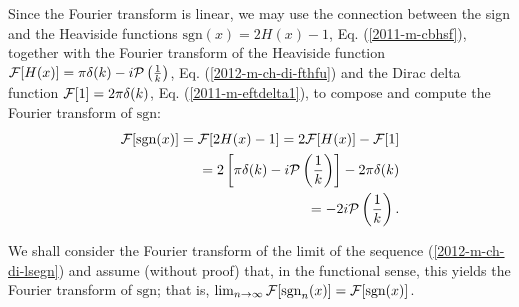 Since the Fourier transform is linear,
we may use the connection between the sign and the Heaviside functions $\textrm{sgn}(x) = 2H(x) -1$, Eq. (\ref{2011-m-cbhsf}),
together with the
Fourier transform of the Heaviside function
${\cal F}[H(x)] =  \pi \delta (k)   -i {\cal P} \left(\frac{1}{k}\right)$,
Eq. (\ref{2012-m-ch-di-fthfu}) and the Dirac delta function
${\cal F}[1] = 2\pi \delta (k)$, Eq. (\ref{2011-m-eftdelta1}),
to compose and compute the Fourier transform  of $\textrm{sgn}$:
\begin{equation}
\begin{split}
{\cal F}[\textrm{sgn}(x)] = {\cal F}[2H(x) -1] = 2{\cal F}[H(x)] - {\cal F}[1]
\\ \qquad =
2 \left[\pi \delta (k)   -i {\cal P} \left(\frac{1}{k}\right)\right] -  2\pi \delta (k)
\\ \qquad =
-2i {\cal P} \left(\frac{1}{k}\right)
.
\end{split}
\label{2011-m-ch-di-fdsgnfu}
\end{equation}

We shall consider the Fourier transform of the limit of the sequence (\ref{2012-m-ch-di-lsegn})
and assume (without proof) that, in the functional sense,
this yields the   Fourier transform of $\textrm{sgn}$; that is,
$
\lim_{n\rightarrow \infty}
{\cal F}[ \textrm{sgn}_n(x) ]
=
{\cal F}[ \textrm{sgn}(x) ]
$.

